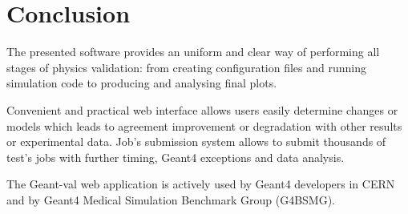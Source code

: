 \section{Conclusion}
\label{sec-status}

The presented software provides an uniform and clear way of performing all stages of physics validation: from creating configuration files and running simulation code to producing and analysing final plots.

Convenient and practical web interface allows users easily determine changes or models which leads to agreement improvement or degradation with other results or experimental data. Job's submission system allows to submit thousands of test's jobs with further timing, Geant4 exceptions and data analysis.

The \textsf{Geant-val} web application
is actively used by Geant4 developers in CERN and by Geant4 Medical Simulation Benchmark Group (G4BSMG).





